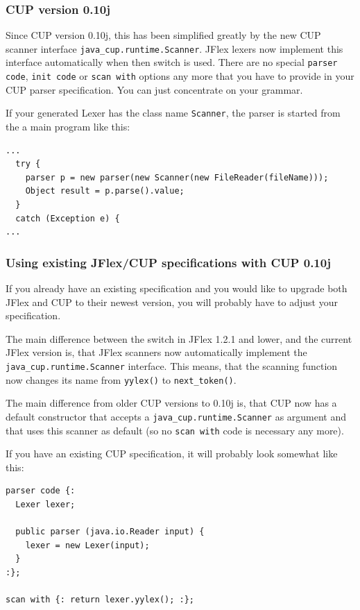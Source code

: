 \documentclass[11pt]{scrartcl}
\newcommand{\xsmall}{}
\begin{document}
\subsubsection{CUP version 0.10j}
Since CUP version 0.10j, this has been simplified greatly by the new 
CUP scanner interface \texttt{java\_cup.runtime.Scanner}. JFlex lexers now implement
this interface automatically when then \texttt{}
switch is used. There are no special \texttt{parser code}, \texttt{init
  code} or \texttt{scan with} options any more that you have to provide
in your CUP parser specification. You can just concentrate on your grammar.

If your generated Lexer has the class name \texttt{Scanner}, the parser
is started from the a main program like this:

{\xsmall\begin{verbatim}
...
  try {
    parser p = new parser(new Scanner(new FileReader(fileName)));
    Object result = p.parse().value;
  }
  catch (Exception e) {
...
\end{verbatim}
}

\subsubsection{Using existing JFlex/CUP specifications with CUP 0.10j}
If you already have an existing specification and you would like to upgrade
both JFlex and CUP to their newest version, you will probably have to adjust
your specification.

The main difference between the \texttt{} switch in
JFlex 1.2.1 and lower, and the current JFlex version is, that JFlex scanners
now automatically implement the \texttt{java\_cup.runtime.Scanner} interface.
This means, that the scanning function now changes its name from \texttt{yylex()}
to \texttt{next\_token()}. 

The main difference from older CUP versions to 0.10j is, that CUP now
has a default constructor that accepts a \texttt{java\_cup.runtime.Scanner} 
as argument and that uses this scanner as
default (so no \texttt{scan with} code is necessary any more).

If you have an existing CUP specification, it will probably look somewhat like this:
{\xsmall\begin{verbatim}
parser code {:
  Lexer lexer;

  public parser (java.io.Reader input) {
    lexer = new Lexer(input);
  }
:};

scan with {: return lexer.yylex(); :};
\end{verbatim}
}
\end{document}
